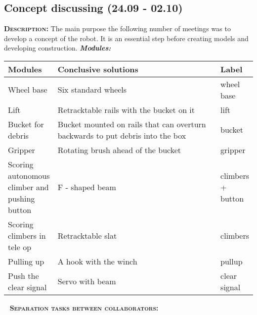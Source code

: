\subsection{Concept discussing (24.09 - 02.10)}
	\textsc{\textbf{Description:}} The main purpose the following number of meetings was to develop a concept of the robot. It is an essential step before creating models and developing construction.\newline \newline
	\textit{\textbf{Modules:}}
	
	\begin{table}[H]
		\vspace{-2mm}
		\begin{center}
			\begin{tabular}{|p{0.2\linewidth}|p{0.7\linewidth}|p{0.1\linewidth}|}
				\hline
				Modules & Conclusive solutions & Label \\
				\hline
				Wheel base & Six standard wheels & wheel base \\
				\hline
				Lift & Retracktable rails with the bucket on it & lift \\
				\hline
				Bucket for debris & Bucket mounted on rails that can overturn backwards to put debris into the box & bucket \\
				\hline
				Gripper & Rotating brush ahead of the bucket & gripper\\
				\hline
				Scoring autonomous climber and pushing button & F - shaped beam & climbers + button\\
				\hline
				Scoring climbers in tele op & Retracktable slat & climbers\\
				\hline
				Pulling up & A hook with the winch & pullup\\
				\hline
				Push the clear signal & Servo with beam & clear signal\\
				\hline
			\end{tabular}
		\end{center}
	\end{table}
	\vspace{-10mm}
	 \newline
	\textsc{\textbf{Separation tasks between collaborators:}}
	
